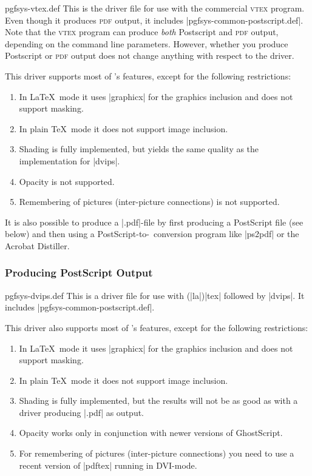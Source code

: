 \begin{filedescription}{pgfsys-vtex.def}
  This is the driver file for use with the commercial \textsc{vtex}
  program. Even though it produces  \textsc{pdf} output, it
  includes |pgfsys-common-postscript.def|. Note that the
  \textsc{vtex} program can produce \emph{both} Postscript and
  \textsc{pdf} output, depending on the command line
  parameters. However, whether you produce Postscript or
  \textsc{pdf} output does not change anything with respect to the
  driver. 

  This driver supports most of \pgfname's features, except for
  the following restrictions:
  \begin{enumerate}
  \item
    In \LaTeX\ mode it uses |graphicx| for the graphics
    inclusion and does not support masking.
  \item
    In plain \TeX\ mode it does not support image inclusion.
  \item
    Shading is fully implemented, but yields the same quality as the
    implementation for |dvips|.
  \item
    Opacity is not supported.
  \item
    Remembering of pictures (inter-picture connections) is not
    supported. 
  \end{enumerate}
\end{filedescription}

It is also possible to produce a |.pdf|-file by first producing a
PostScript file (see below) and then using a PostScript-to-\pdf\
conversion program like |ps2pdf| or the Acrobat Distiller.


\subsubsection{Producing PostScript Output}

\begin{filedescription}{pgfsys-dvips.def}
  This is a driver file for use with (|la|)|tex| followed by
  |dvips|. It includes |pgfsys-common-postscript.def|.

  This driver also supports most of \pgfname's features, except for
  the following restrictions:
  \begin{enumerate}
  \item
    In \LaTeX\ mode it uses |graphicx| for the graphics
    inclusion and does not support masking.
  \item
    In plain \TeX\ mode it does not support image inclusion.
  \item
    Shading is fully implemented, but the results will not be 
    as good as with a driver producing |.pdf| as output. 
  \item
    Opacity works only in conjunction with newer versions of
    GhostScript. 
  \item
    For remembering of pictures (inter-picture connections) you need
    to use a recent version of |pdftex| running in DVI-mode.
  \end{enumerate}
\end{filedescription}

